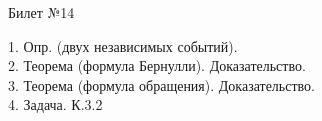 \documentclass[preview]{standalone}
\begin{document}
 
\begin{center} {\Large Билет №14} \end{center} 

1.  Опр. (двух независимых событий).\\

2.   Теорема (формула Бернулли). Доказательство.\\

3.  Теорема (формула обращения). Доказательство.\\

4. Задача. К.3.2\\
\end{document}
